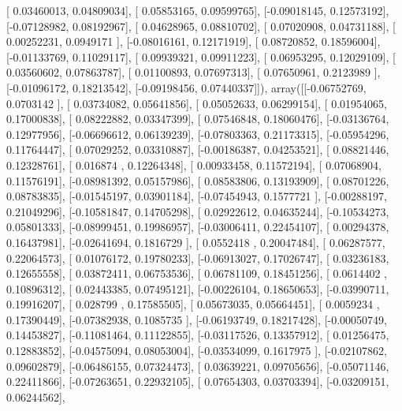 \documentclass{article}
\begin{document}
       [ 0.03460013,  0.04809034],
       [ 0.05853165,  0.09599765],
       [-0.09018145,  0.12573192],
       [-0.07128982,  0.08192967],
       [ 0.04628965,  0.08810702],
       [ 0.07020908,  0.04731188],
       [ 0.00252231,  0.0949171 ],
       [-0.08016161,  0.12171919],
       [ 0.08720852,  0.18596004],
       [-0.01133769,  0.11029117],
       [ 0.09939321,  0.09911223],
       [ 0.06953295,  0.12029109],
       [ 0.03560602,  0.07863787],
       [ 0.01100893,  0.07697313],
       [ 0.07650961,  0.2123989 ],
       [-0.01096172,  0.18213542],
       [-0.09198456,  0.07440337]]), array([[-0.06752769,  0.0703142 ],
       [ 0.03734082,  0.05641856],
       [ 0.05052633,  0.06299154],
       [ 0.01954065,  0.17000838],
       [ 0.08222882,  0.03347399],
       [ 0.07546848,  0.18060476],
       [-0.03136764,  0.12977956],
       [-0.06696612,  0.06139239],
       [-0.07803363,  0.21173315],
       [-0.05954296,  0.11764447],
       [ 0.07029252,  0.03310887],
       [-0.00186387,  0.04253521],
       [ 0.08821446,  0.12328761],
       [ 0.016874  ,  0.12264348],
       [ 0.00933458,  0.11572194],
       [ 0.07068904,  0.11576191],
       [-0.08981392,  0.05157986],
       [ 0.08583806,  0.13193909],
       [ 0.08701226,  0.08783835],
       [-0.01545197,  0.03901184],
       [-0.07454943,  0.1577721 ],
       [-0.00288197,  0.21049296],
       [-0.10581847,  0.14705298],
       [ 0.02922612,  0.04635244],
       [-0.10534273,  0.05801333],
       [-0.08999451,  0.19986957],
       [-0.03006411,  0.22454107],
       [ 0.00294378,  0.16437981],
       [-0.02641694,  0.1816729 ],
       [ 0.0552418 ,  0.20047484],
       [ 0.06287577,  0.22064573],
       [ 0.01076172,  0.19780233],
       [-0.06913027,  0.17026747],
       [ 0.03236183,  0.12655558],
       [ 0.03872411,  0.06753536],
       [ 0.06781109,  0.18451256],
       [ 0.0614402 ,  0.10896312],
       [ 0.02443385,  0.07495121],
       [-0.00226104,  0.18650653],
       [-0.03990711,  0.19916207],
       [ 0.028799  ,  0.17585505],
       [ 0.05673035,  0.05664451],
       [ 0.0059234 ,  0.17390449],
       [-0.07382938,  0.1085735 ],
       [-0.06193749,  0.18217428],
       [-0.00050749,  0.14453827],
       [-0.11081464,  0.11122855],
       [-0.03117526,  0.13357912],
       [ 0.01256475,  0.12883852],
       [-0.04575094,  0.08053004],
       [-0.03534099,  0.1617975 ],
       [-0.02107862,  0.09602879],
       [-0.06486155,  0.07324473],
       [ 0.03639221,  0.09705656],
       [-0.05071146,  0.22411866],
       [-0.07263651,  0.22932105],
       [ 0.07654303,  0.03703394],
       [-0.03209151,  0.06244562],
\end{document}
